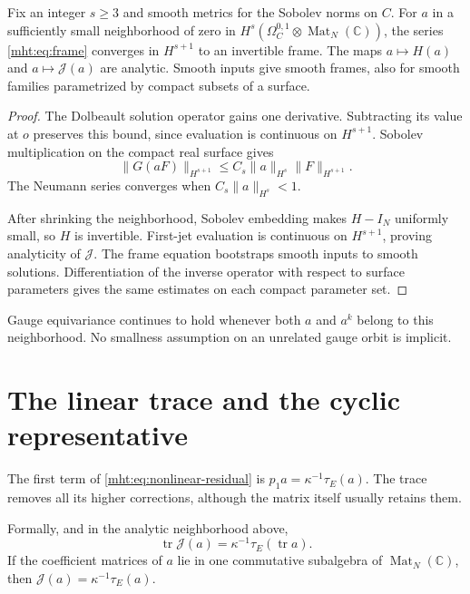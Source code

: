 \begin{proposition}\label{mht:prop:analytic-frame}
Fix an integer $s\geq3$ and smooth metrics for the Sobolev norms on $C$.
For $a$ in a sufficiently small neighborhood of zero in
$H^s(\Omega_C^{0,1}\otimes\operatorname{Mat}_N(\mathbb C))$, the series
\eqref{mht:eq:frame} converges in $H^{s+1}$ to an invertible frame.
The maps $a\mapsto H(a)$ and $a\mapsto\mathcal J(a)$ are analytic.
Smooth inputs give smooth frames, also for smooth families parametrized
by compact subsets of a surface.
\end{proposition}

\begin{proof}
The Dolbeault solution operator gains one derivative. Subtracting its
value at $o$ preserves this bound, since evaluation is continuous on
$H^{s+1}$. Sobolev multiplication on the compact real surface gives
\[
 \|G(aF)\|_{H^{s+1}}
       \leq C_s\|a\|_{H^s}\|F\|_{H^{s+1}}.
\]
The Neumann series converges when $C_s\|a\|_{H^s}<1$.

After shrinking the neighborhood, Sobolev embedding makes $H-I_N$
uniformly small, so $H$ is invertible. First-jet evaluation is continuous
on $H^{s+1}$, proving analyticity of $\mathcal J$. The frame equation
bootstraps smooth inputs to smooth solutions. Differentiation of the
inverse operator with respect to surface parameters gives the same
estimates on each compact parameter set.
\end{proof}

Gauge equivariance continues to hold whenever both $a$ and $a^k$ belong
to this neighborhood. No smallness assumption on an unrelated gauge
orbit is implicit.

\section{The linear trace and the cyclic representative}

The first term of \eqref{mht:eq:nonlinear-residual} is
$p_1a=\kappa^{-1}\tau_E(a)$. The trace removes all its higher corrections,
although the matrix itself usually retains them.

\begin{proposition}\label{mht:prop:linear-first-trace}
Formally, and in the analytic neighborhood above,
\[
 \operatorname{tr}\mathcal J(a)=\kappa^{-1}\tau_E(\operatorname{tr}a).
\]
If the coefficient matrices of $a$ lie in one commutative subalgebra of
$\operatorname{Mat}_N(\mathbb C)$, then
$\mathcal J(a)=\kappa^{-1}\tau_E(a)$.
\end{proposition}

